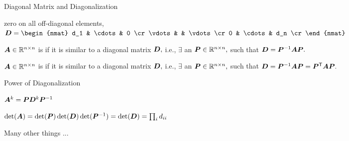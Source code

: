 \documentclass[fleqn,aspectratio=169]{beamer}
\begin{document}
\begin{frame}{Diagonal Matrix and Diagonalization}

\plitemsep 0.1in

\bci

\item {} zero on all off-diagonal elements, $\mat{D} = 
\begin{nmat}
d_1 & \cdots & 0 \cr
\vdots &  & \vdots \cr
0 & \cdots & d_n \cr
\end{nmat}$


\item {} $\bm{A} \in {\mathbb R}^{n \times n}$ is  if it is similar to a diagonal matrix $\bm{D},$ i.e., $\exists$ an  $\bm{P} \in {\mathbb R}^{n \times n},$ such that $\bm{D} = {{\bm{P}}^{-1}} \bm{A} \bm{P}.$

\item {} $\bm{A} \in {\mathbb R}^{n \times n}$ is  if it is similar to a diagonal matrix $\bm{D},$ i.e., $\exists$ an   $\bm{P} \in {\mathbb R}^{n \times n},$ such that $\bm{D} = {{\bm{P}}^{-1}} \bm{A} \bm{P} = {\bm{P}}^{\mathsf{T}} \bm{A} \bm{P}.$


\eci

\end{frame}

\begin{frame}{Power of Diagonalization}

\plitemsep 0.2in

\bci


\item $\bm{A}^k = \bm{P} \bm{D}^k {{\bm{P}}^{-1}}$

\item $\det(\bm{A}) = \det(\bm{P})\det(\bm{D})\det({{\bm{P}}^{-1}}) = \det(\bm{D}) = \prod_i d_{ii}$ 

\item Many other things ...

\item \question {}

\eci

\end{frame}
\end{document}
